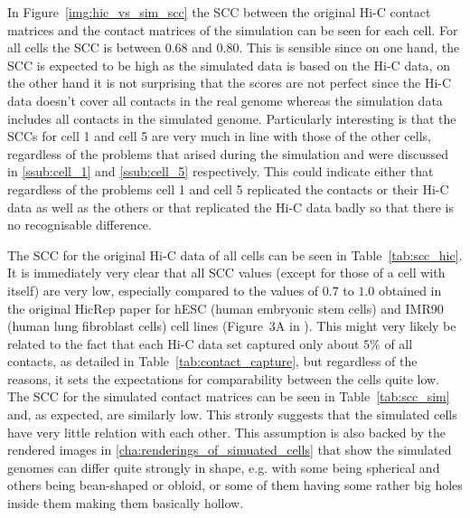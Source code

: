 In Figure~\ref{img:hic_vs_sim_scc} the SCC between the original Hi-C contact matrices and the contact matrices of the simulation can be seen for each cell. For all cells the SCC is between 0.68 and 0.80. This is sensible since on one hand, the SCC is expected to be high as the simulated data is based on the Hi-C data, on the other hand it is not surprising that the scores are not perfect since the Hi-C data doesn’t cover all contacts in the real genome whereas the simulation data includes all contacts in the simulated genome. Particularly interesting is that the SCCs for cell 1 and cell 5 are very much in line with those of the other cells, regardless of the problems that arised during the simulation and were discussed in \ref{ssub:cell_1} and \ref{ssub:cell_5} respectively. This could indicate either that regardless of the problems cell 1 and cell 5 replicated the contacts or their Hi-C data as well as the others or that replicated the Hi-C data badly so that there is no recognisable difference.

The SCC for the original Hi-C data of all cells can be seen in Table~\ref{tab:scc_hic}. It is immediately very clear that all SCC values (except for those of a cell with itself) are very low, especially compared to the values of \(0.7\) to \(1.0\) obtained in the original HicRep paper for hESC (human embryonic stem cells) and IMR90 (human lung fibroblast cells) cell lines (Figure~3A in \cite{yang_hicrep_2017}). This might very likely be related to the fact that each Hi-C data set captured only about \(5\%\) of all contacts, as detailed in Table~\ref{tab:contact_capture}, but regardless of the reasons, it sets the expectations for comparability between the cells quite low. The SCC for the simulated contact matrices can be seen in Table~\ref{tab:scc_sim} and, as expected, are similarly low. This stronly suggests that the simulated cells have very little relation with each other. This assumption is also backed by the rendered images in \ref{cha:renderings_of_simuated_cells} that show the simulated genomes can differ quite strongly in shape, e.g. with some being spherical and others being bean-shaped or obloid, or some of them having some rather big holes inside them making them basically hollow.

